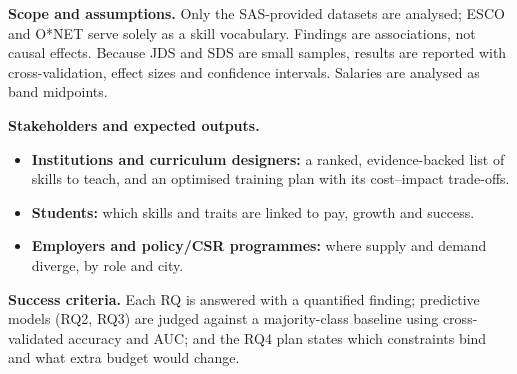 \documentclass[12pt,a4paper]{article}
\begin{document}
\vspace{6pt}
\noindent\textbf{Scope and assumptions.}
Only the SAS-provided datasets are analysed; ESCO and O*NET serve solely as a skill vocabulary.
Findings are associations, not causal effects. Because JDS and SDS are small samples, results
are reported with cross-validation, effect sizes and confidence intervals. Salaries are
analysed as band midpoints.

\vspace{4pt}
\noindent\textbf{Stakeholders and expected outputs.}
\begin{itemize}
  \item \textbf{Institutions and curriculum designers:} a ranked, evidence-backed list of skills
        to teach, and an optimised training plan with its cost--impact trade-offs.
  \item \textbf{Students:} which skills and traits are linked to pay, growth and success.
  \item \textbf{Employers and policy/CSR programmes:} where supply and demand diverge, by role and city.
\end{itemize}

\vspace{4pt}
\noindent\textbf{Success criteria.}
Each RQ is answered with a quantified finding; predictive models (RQ2, RQ3) are judged against
a majority-class baseline using cross-validated accuracy and AUC; and the RQ4 plan states which
constraints bind and what extra budget would change.
\end{document}
